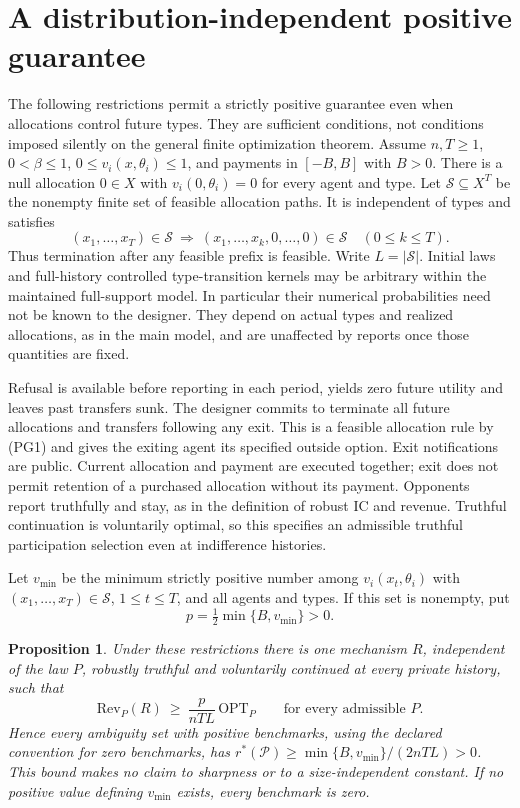\documentclass[11pt,a4paper]{article}
\newtheorem{proposition}[theorem]{Proposition}
\begin{document}
\section{A distribution-independent positive guarantee}
\label{sec:positive-guarantee}

The following restrictions permit a strictly positive guarantee even when
allocations control future types. They are sufficient conditions, not
conditions imposed silently on the general finite optimization theorem.
Assume $n,T\geq1$, $0<\beta\leq1$, $0\leq v_i(x,\theta_i)\leq1$, and
payments in $[-B,B]$ with $B>0$. There is a null allocation $0\in X$ with
$v_i(0,\theta_i)=0$ for every agent and type. Let
$\mathcal S\subseteq X^T$ be the nonempty finite set of feasible allocation
paths. It is independent of types and satisfies
\[
 (x_1,\ldots,x_T)\in\mathcal S
 \ \Longrightarrow\
 (x_1,\ldots,x_k,0,\ldots,0)\in\mathcal S
 \quad(0\leq k\leq T).
 \tag{PG1}
\]
Thus termination after any feasible prefix is feasible. Write
$L=|\mathcal S|$. Initial laws and full-history controlled type-transition
kernels may be arbitrary within the maintained full-support model. In
particular their numerical probabilities need not be known to the designer.
They depend on actual types and realized allocations, as in the main model,
and are unaffected by reports once those quantities are fixed.

Refusal is available before reporting in each period, yields zero future
utility and leaves past transfers sunk. The designer commits to terminate
all future allocations and transfers following any exit. This is a feasible
allocation rule by \textup{(PG1)} and gives the exiting agent its specified
outside option. Exit notifications are public. Current allocation and payment
are executed together; exit
does not permit retention of a purchased allocation without its payment.
Opponents report truthfully and stay, as in the definition of robust IC and
revenue. Truthful continuation is voluntarily optimal, so this specifies an
admissible truthful participation selection even at indifference histories.

Let $v_{\min}$ be the minimum strictly positive number among
$v_i(x_t,\theta_i)$ with $(x_1,\ldots,x_T)\in\mathcal S$, $1\leq t\leq T$,
and all agents and types. If this set is nonempty, put
\[
 p=\tfrac12\min\{B,v_{\min}\}>0.
 \tag{PG2}
\]

\begin{proposition}\label{prop:positive-guarantee}
Under these restrictions there is one mechanism $R$, independent of the
law $P$, robustly truthful and voluntarily continued at every private
history, such that
\[
 \mathrm{Rev}_P(R)\ \geq\ \frac{p}{nTL}\,\mathrm{OPT}_P
 \qquad\text{for every admissible }P.
 \tag{PG3}
\]
Hence every ambiguity set with positive benchmarks, using the declared
convention for zero benchmarks, has
$r^*(\mathcal P)\geq\min\{B,v_{\min}\}/(2nTL)>0$.
This bound makes no claim to sharpness or to a size-independent constant.
If no positive value defining $v_{\min}$ exists, every benchmark is zero.
\end{proposition}
\end{document}
